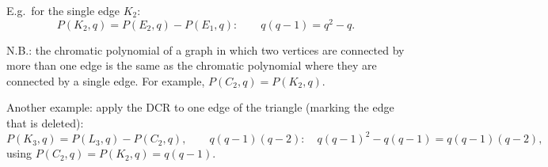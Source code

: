 E.g.\ for the single edge $K_2$:
\begin{equation}
  P(K_2,q) = P(E_2,q) - P(E_1,q):\qquad q(q-1) = q^2-q .
\end{equation}

N.B.: the chromatic polynomial of a graph in which two vertices are connected by more than one edge is the same as the chromatic
polynomial where they are connected by a single edge. For example, $P(C_2,q) = P(K_2,q)$.

Another example: apply the DCR to one edge of the triangle (marking the edge that is deleted):
\begin{equation}
  P(K_3,q) = P(L_3,q) - P(C_2,q),\qquad
  q(q-1)(q-2):\quad q(q-1)^2 - q(q-1) = q(q-1)(q-2),
\end{equation}
using $P(C_2,q) = P(K_2,q) = q(q-1)$.
